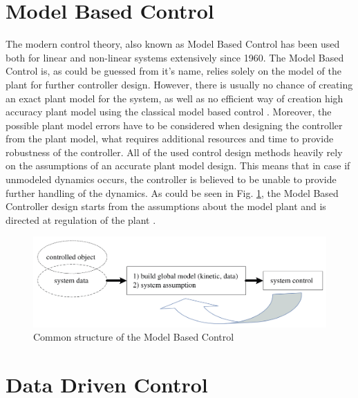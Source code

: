 \documentclass[]{final_report}
\begin{document}
\section{Model Based Control}

The modern control theory, also known as Model Based Control has been used both for linear and non-linear systems extensively since 1960. The Model Based Control is, as could be guessed from it's name, relies solely on the model of the plant for further controller design. However, there is usually no chance of creating an exact plant model for the system, as well as no efficient way of creation high accuracy plant model using the classical model based control \cite{hou2013model}. Moreover, the possible plant model errors have to be considered when designing the controller from the plant model, what requires additional resources and time to provide robustness of the controller. All of the used control design methods heavily rely on the assumptions of an accurate plant model design. This means that in case if unmodeled dynamics occurs, the controller is believed to be unable to provide further handling of the dynamics. As could be seen in Fig. \ref{fig:mbcsctruct}, the Model Based Controller design starts from the assumptions about the model plant and is directed at regulation of the plant \cite{hou2013model}.

\begin{figure} [h!]
\centerline{\includegraphics[width=.65\textwidth]{Screenshots for paper/1.png}}
\caption{Common structure of the Model Based Control \cite{hou2013model}}
\label{fig:mbcsctruct}
\end{figure}

\section{Data Driven Control}
\end{document}
